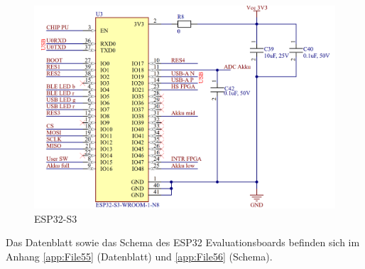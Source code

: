 \begin{figure}[H]
    \centering
    \includegraphics[width=0.8\linewidth]{Figures/Chap3/Schematics/ESP32.png}
    \caption{ESP32-S3}
    \label{fig:ESP32}
\end{figure}

Das Datenblatt sowie das Schema des ESP32 Evaluationsboards befinden sich im Anhang \ref{app:File55} (Datenblatt) und \ref{app:File56} (Schema).

